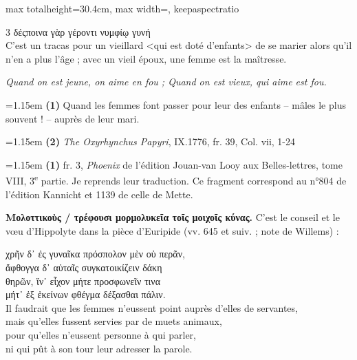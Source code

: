 \documentclass[11pt,twoside]{book}
\newcommand{\italique}[1]{\textit{#1}}
\newcommand{\citComm}[1]{\begin{quoting}[vskip=0.4pt,leftmargin=0.7em,rightmargin=0.2em]#1\end{quoting}}
\newcommand{\nieme}[1]{#1\textsuperscript{e}}
\newcommand{\francais}[1]{{\policeFr #1}}
\begin{document}
\begin{adjustbox}{max totalheight=30.4cm, max width=\textwidth, keepaspectratio}
\begin{minipage}{\textwidth}
{\begin{multicols}{3}
{δέςποινα γὰρ γέροντι νυμφίῳ γυνή\\
\francais{C'est un tracas pour un vieillard <qui est doté d'enfants> de se marier alors qu'il n'en a plus l'âge ; avec un vieil époux, une femme est la maîtresse.}}
\par\vspace{1.5pt}
\noindent \italique{Quand on est jeune, on aime en fou ; Quand on est vieux, qui aime est fou.}
\par\vspace{1.5pt}
\par\vspace{1.2pt}\par\nopagebreak\vspace{1pt}\noindent\hangindent=1.15em {\color{sepiaNote}\textbf{(1)}} Quand les femmes font passer pour leur des enfants – mâles le plus souvent ! – auprès de leur mari.
\par\vspace{1.5pt}
\noindent\hangindent=1.15em {\color{sepiaNote}\textbf{(2)}} \italique{The Oxyrhynchus Papyri}, IX.1776, fr. 39, Col. vii, 1-24
\par\vspace{1.5pt}
\noindent\hangindent=1.15em {\color{sepiaNote}\textbf{(1)}} fr. 3, \italique{Phoenix} de l'édition Jouan-van Looy aux Belles-lettres, tome VIII, \nieme{3} partie. Je reprends leur traduction. Ce fragment correspond au n°804 de l'édition Kannicht et 1139 de celle de Mette.
\par\vspace{1.5pt}
 \textbf{Μολοττικοὺς / τρέφουσι μορμολυκεῖα τοῖς μοιχοῖς κύνας.} C'est le conseil et le vœu d'Hippolyte dans la pièce d'Euripide (vv. 645 et suiv. ; note de Willems) :
\citComm{χρῆν δ᾽ ἐς γυναῖκα πρόσπολον μὲν οὐ περᾶν,\\
ἄφθογγα δ᾽ αὐταῖς συγκατοικίζειν δάκη\\
θηρῶν, ἵν᾽ εἶχον μήτε προσφωνεῖν τινα\\
μήτ᾽ ἐξ ἐκείνων φθέγμα δέξασθαι πάλιν.\\
\francais{Il faudrait que les femmes n'eussent point auprès d'elles de servantes,\\
mais qu'elles fussent servies par de muets animaux,\\
pour qu'elles n'eussent personne à qui parler,\\
ni qui pût à son tour leur adresser la parole.}}

\end{multicols}}
\end{minipage}
\end{adjustbox}
\end{document}
